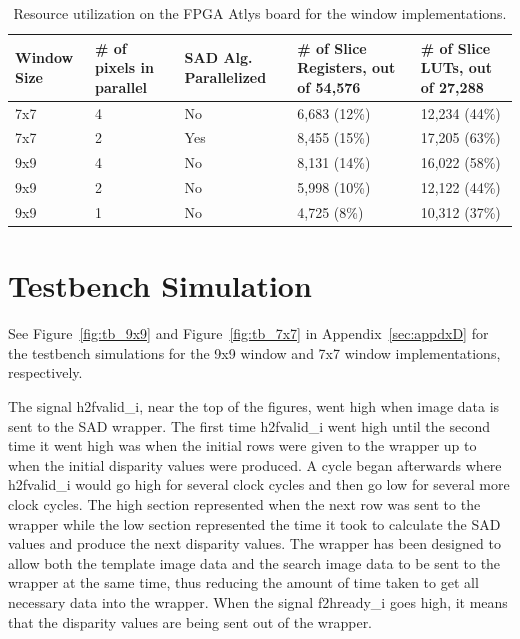\begin{table}
\begin{center}
	\begin{tabular}{| p{1.9cm} | p{2.2cm} | p{2.5cm} | p{2.9cm} | p{2.7cm} |}
		\hline
		\rowstyle{\bfseries} Window Size & 
		\rowstyle{\bfseries} \# of pixels in parallel & 
		\rowstyle{\bfseries} SAD Alg. Parallelized & 
		\rowstyle{\bfseries} \# of Slice Registers, out of 54,576 &
		\rowstyle{\bfseries} \# of Slice LUTs, out of 27,288 %
		\tabularnewline
		\hline
		7x7 & 4 & No & 6,683 (12\%) & 12,234 (44\%) %
		\tabularnewline
		\hline 
		\rowstyle{\bfseries} 7x7 & 
		\rowstyle{\bfseries} 2 & 
		\rowstyle{\bfseries} Yes & 
		\rowstyle{\bfseries} 8,455 (15\%) & 
		\rowstyle{\bfseries} 17,205 (63\%) %
		\tabularnewline
		\hline 
		\rowstyle{\bfseries} 9x9 & 
		\rowstyle{\bfseries} 4 & 
		\rowstyle{\bfseries} No & 
		\rowstyle{\bfseries} 8,131 (14\%) & 
		\rowstyle{\bfseries} 16,022 (58\%) %
		\tabularnewline
		\hline
		9x9 & 2 & No & 5,998 (10\%) & 12,122 (44\%) %
		\tabularnewline
		\hline 
		9x9 & 1 & No & 4,725 (8\%) & 10,312 (37\%) %
		\tabularnewline
		\hline 
	\end{tabular}
	\captionfonts
	\caption{Resource utilization on the FPGA Atlys board for the window implementations.}
	\label{table:utilize}
\end{center}
\end{table}

\section{Testbench Simulation}
\label{sec:testbench}

See Figure~\ref{fig:tb_9x9} and Figure~\ref{fig:tb_7x7} in Appendix~\ref{sec:appdxD} for the testbench simulations for the 9x9 window and 7x7 window implementations, respectively.

The signal h2fvalid\_i, near the top of the figures, went high when image data is sent to the SAD wrapper. The first time h2fvalid\_i went high until the second time it went high was when the initial rows were given to the wrapper up to when the initial disparity values were produced. A cycle began afterwards where h2fvalid\_i would go high for several clock cycles and then go low for several more clock cycles. The high section represented when the next row was sent to the wrapper while the low section represented the time it took to calculate the SAD values and produce the next disparity values. The wrapper has been designed to allow both the template image data and the search image data to be sent to the wrapper at the same time, thus reducing the amount of time taken to get all necessary data into the wrapper. When the signal f2hready\_i goes high, it means that the disparity values are being sent out of the wrapper.

